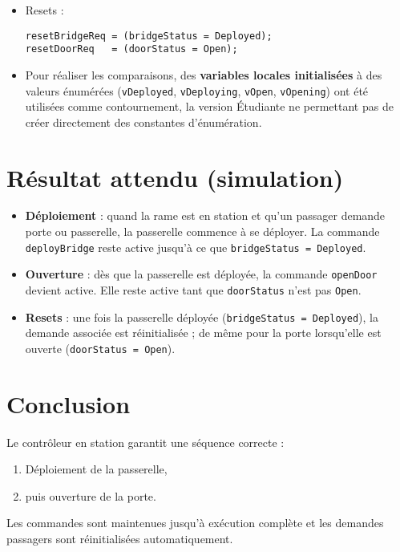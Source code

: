 \documentclass[11pt,a4paper]{report}
\begin{document}
\begin{enumerate}
\begin{itemize}
    \item Resets :
\begin{lstlisting}
resetBridgeReq = (bridgeStatus = Deployed);
resetDoorReq   = (doorStatus = Open);
\end{lstlisting}

    \item Pour réaliser les comparaisons, des \textbf{variables locales initialisées} à des valeurs énumérées
    (\texttt{vDeployed}, \texttt{vDeploying}, \texttt{vOpen}, \texttt{vOpening}) ont été utilisées comme
    contournement, la version Étudiante ne permettant pas de créer directement des constantes d’énumération.
  \end{itemize}
\end{enumerate}

\section*{Résultat attendu (simulation)}
\begin{itemize}
  \item \textbf{Déploiement} : quand la rame est en station et qu’un passager demande porte ou passerelle, la passerelle commence à se déployer. La commande \texttt{deployBridge} reste active jusqu’à ce que \texttt{bridgeStatus = Deployed}.
  \item \textbf{Ouverture} : dès que la passerelle est déployée, la commande \texttt{openDoor} devient active. Elle reste active tant que \texttt{doorStatus} n’est pas \texttt{Open}.
  \item \textbf{Resets} : une fois la passerelle déployée (\texttt{bridgeStatus = Deployed}), la demande associée est réinitialisée ; de même pour la porte lorsqu’elle est ouverte (\texttt{doorStatus = Open}).
\end{itemize}

\section*{Conclusion}
Le contrôleur en station garantit une séquence correcte :
\begin{enumerate}
  \item Déploiement de la passerelle,
  \item puis ouverture de la porte.
\end{enumerate}
Les commandes sont maintenues jusqu’à exécution complète et les demandes passagers sont réinitialisées automatiquement.


\end{document}
